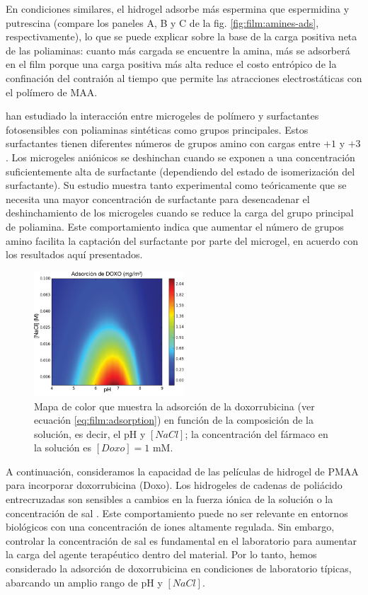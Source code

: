 En condiciones similares, el hidrogel adsorbe m\'as espermina que espermidina y putrescina (compare los paneles A, B y C de la fig.  \ref{fig:film:amines-ads}, respectivamente), lo que se puede explicar sobre la base de la carga positiva neta de las poliaminas: cuanto m\'as cargada se encuentre la amina, m\'as se adsorber\'a en el film porque una carga positiva m\'as alta reduce el costo entr\'opico de la confinaci\'on del contrai\'on al tiempo que permite las atracciones electrost\'aticas con el pol\'imero de MAA.

\citet{Schimka2017} han estudiado la interacci\'on entre microgeles de pol\'imero y surfactantes fotosensibles con poliaminas sint\'eticas como grupos principales. Estos surfactantes tienen diferentes n\'umeros de grupos amino con cargas entre $+1$ y $+3$. Los microgeles ani\'onicos se deshinchan cuando se exponen a una concentraci\'on suficientemente alta de surfactante (dependiendo del estado de isomerizaci\'on del surfactante). Su estudio muestra tanto experimental como te\'oricamente que se necesita una mayor concentraci\'on de surfactante para desencadenar el deshinchamiento de los microgeles cuando se reduce la carga del grupo principal de poliamina. Este comportamiento indica que aumentar el n\'umero de grupos amino facilita la captaci\'on del surfactante por parte del microgel, en acuerdo con los resultados aqu\'i presentados.




\begin{figure}[!htb]
	\centering
	\includegraphics[width=0.5\textwidth]{Figures/graph-film/doxo_load.pdf}
	\caption{Mapa de color que muestra la adsorci\'on de la doxorrubicina (ver ecuaci\'on \ref{eq:film:adsorption}) en funci\'on de la composici\'on de la soluci\'on, es decir, el pH y $[NaCl]$; la concentraci\'on del f\'armaco en la soluci\'on es $[Doxo]=1$ mM.}
	\label{fig:film:doxo-load}
\end{figure}


A continuaci\'on, consideramos la capacidad de las pel\'iculas de hidrogel de PMAA para incorporar doxorrubicina (Doxo). Los hidrogeles de cadenas de poli\'acido entrecruzadas son sensibles a cambios en la fuerza i\'onica de la soluci\'on o la concentraci\'on de sal \cite{zhang2000}. Este comportamiento puede no ser relevante en entornos biol\'ogicos con una concentraci\'on de iones altamente regulada. Sin embargo, controlar la concentraci\'on de sal es fundamental en el laboratorio para aumentar la carga del agente terap\'eutico dentro del material. Por lo tanto, hemos considerado la adsorci\'on de doxorrubicina en condiciones de laboratorio t\'ipicas, abarcando un amplio rango de pH y $[NaCl]$. 

